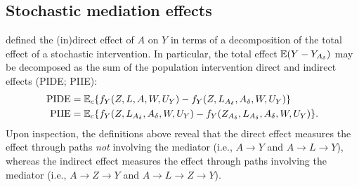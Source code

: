 
\subsection{Stochastic mediation effects}

\cite{diaz2020causal} defined the (in)direct effect of $A$ on $Y$ in
terms of a decomposition of the total effect of a stochastic
intervention. In particular, the total effect $\mathbb{E}(Y - Y_{A_\delta})$ may be
decomposed as the sum of the population intervention direct and indirect effects
(PIDE; PIIE):
\begin{align*}
  \text{PIDE} &= \mathbb{E}_c\{f_Y(Z, L, A, W,U_Y) -
                f_Y(Z, L_{A_\delta},A_\delta,W,U_Y)\}\\
  \text{PIIE} &= \mathbb{E}_c\{f_Y(Z, L_{A_\delta},A_\delta,W,U_Y) -
                f_Y(Z_{A_\delta},L_{A_\delta},A_\delta,W,U_Y)\}.
\end{align*}
Upon inspection, the definitions above reveal that the direct effect
measures the effect through paths \emph{not} involving the mediator
(i.e., $A \rightarrow Y$ and $A\rightarrow L \rightarrow Y$), whereas the
indirect effect measures the effect through paths involving the mediator
(i.e., $A\rightarrow Z \rightarrow Y$ and $A\rightarrow L \rightarrow Z
\rightarrow Y$).

